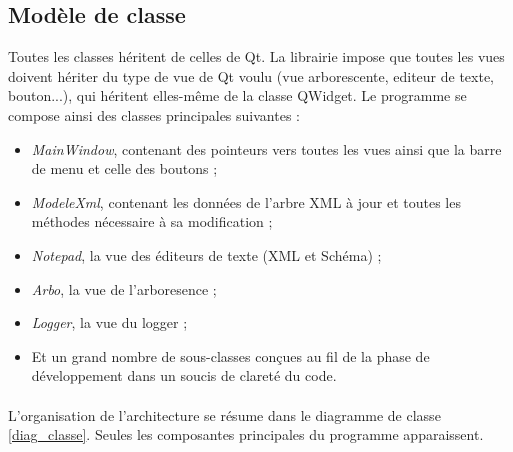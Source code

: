 \subsection{Modèle de classe}
Toutes les classes héritent de celles de Qt. La librairie impose que toutes les vues doivent hériter du type de vue de Qt voulu (vue arborescente, editeur de texte, bouton...), qui héritent elles-même de la classe QWidget.
Le programme se compose ainsi des classes principales suivantes :
\begin{itemize}
\item \emph{MainWindow}, contenant des pointeurs vers toutes les vues ainsi que la barre de menu et celle des boutons ;
\item \emph{ModeleXml}, contenant les données de l'arbre XML à jour et toutes les méthodes nécessaire à sa modification ;
\item \emph{Notepad}, la vue des éditeurs de texte (XML et Schéma) ;
\item \emph{Arbo}, la vue de l'arboresence ;
\item \emph{Logger}, la vue du logger ;
\item Et un grand nombre de sous-classes conçues au fil de la phase de développement dans un soucis de clareté du code.
\end{itemize}

\paragraph{}
L'organisation de l'architecture se résume dans le diagramme de classe \ref{diag_classe}. Seules les composantes principales du programme apparaissent.

